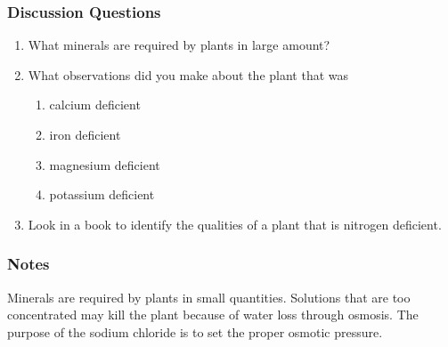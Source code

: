 \subsubsection*{Discussion Questions}
\begin{enumerate}
\item{What minerals are required by plants in large amount?}
\item{What observations did you make about the plant that was} 
\begin{enumerate}
\item{calcium deficient}
\item{iron deficient}
\item{magnesium deficient}
\item{potassium deficient}
\end{enumerate}
\item{Look in a book to identify the qualities of a plant that is nitrogen deficient.}
\end{enumerate}

\subsubsection*{Notes}
Minerals are required by plants in small quantities. Solutions that are too concentrated may kill the plant because of water loss through osmosis. The purpose of the sodium chloride is to set the proper osmotic pressure.